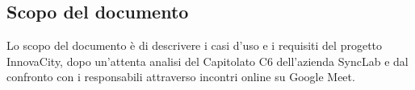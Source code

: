 \subsection{Scopo del documento}
Lo scopo del documento è di descrivere i casi d'uso e i requisiti del progetto InnovaCity, dopo un'attenta analisi del Capitolato C6 dell'azienda SyncLab e dal confronto con i responsabili attraverso incontri online su Google Meet. 